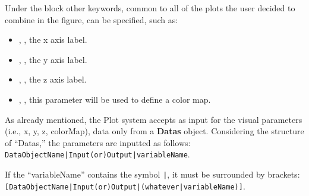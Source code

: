 Under the  block other keywords, common to all of the
plots the user decided to combine in the figure, can be specified, such as:
\begin{itemize}
  \item {}, , the x axis
  label.
  \item {}, , the y axis
  label.
  \item {}, ,
  the z axis label.
  \item {}, , this parameter will be used to
  define a color map.
\end{itemize}
As already mentioned, the Plot system accepts as input for the visual parameters
(i.e., x, y, z, colorMap), data only from a \textbf{Datas} object.
%
Considering the structure of ``Datas,'' the parameters are inputted as follows:
\texttt{DataObjectName|Input(or)Output|variableName}.

If the ``variableName'' contains the symbol \texttt{|}, it must be surrounded by
brackets:
\\ \texttt{[DataObjectName|Input(or)Output|(whatever|variableName)]}.

